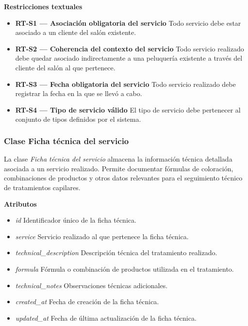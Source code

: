 \textbf{Restricciones textuales}

\begin{itemize}

      \item \textbf{RT-S1 — Asociación obligatoria del servicio}
            Todo servicio debe estar asociado a un cliente del salón existente.
      \item \textbf{RT-S2 — Coherencia del contexto del servicio}
            Todo servicio realizado debe quedar asociado indirectamente a una peluquería existente a través del cliente del salón al que pertenece.
      \item \textbf{RT-S3 — Fecha obligatoria del servicio}
            Todo servicio realizado debe registrar la fecha en la que se llevó a cabo.
      \item \textbf{RT-S4 — Tipo de servicio válido}
            El tipo de servicio debe pertenecer al conjunto de tipos definidos por el sistema.

\end{itemize}

\subsubsection{Clase Ficha técnica del servicio}

La clase \textit{Ficha técnica del servicio} almacena la información técnica detallada asociada a un servicio realizado. Permite documentar fórmulas de coloración, combinaciones de productos y otros datos relevantes para el seguimiento técnico de tratamientos capilares.

\textbf{Atributos}

\begin{itemize}

      \item \textit{id}
            Identificador único de la ficha técnica.
      \item \textit{service}
            Servicio realizado al que pertenece la ficha técnica.
      \item \textit{technical\_description}
            Descripción técnica del tratamiento realizado.
      \item \textit{formula}
            Fórmula o combinación de productos utilizada en el tratamiento.
      \item \textit{technical\_notes}
            Observaciones técnicas adicionales.
      \item \textit{created\_at}
            Fecha de creación de la ficha técnica.
      \item \textit{updated\_at}
            Fecha de última actualización de la ficha técnica.

\end{itemize}

